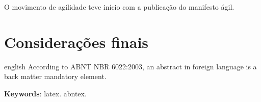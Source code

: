 \documentclass[
	article,			%
	11pt,				%
	oneside,			%
	a4paper,			%
	english,			%
	brazil,				%
	sumario=tradicional
	]{abntex2}
\begin{document}
O movimento de agilidade teve início com a publicação do manifesto ágil.


% 

\section*{Considerações finais}

\postextual



\emptythanks
\maketitle

\renewcommand{\resumoname}{Abstract}
\begin{resumoumacoluna}
 \begin{otherlanguage*}{english}
   According to ABNT NBR 6022:2003, an abstract in foreign language is a back
   matter mandatory element.

   \vspace{\onelineskip}
 
   \noindent
   \textbf{Keywords}: latex. abntex.
 \end{otherlanguage*}  
\end{resumoumacoluna}




%
%

\end{document}
